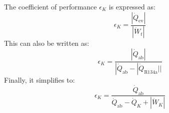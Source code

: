 The coefficient of performance \( \epsilon_K \) is expressed as:  
\[
\epsilon_K = \frac{|\dot{Q}_{\text{ev}}|}{|\dot{W}_t|}
\]  
This can also be written as:  
\[
\epsilon_K = \frac{|\dot{Q}_{\text{ab}}|}{|\dot{Q}_{\text{ab}} - |\dot{Q}_{\text{R134a}}||}
\]  
Finally, it simplifies to:  
\[
\epsilon_K = \frac{\dot{Q}_{\text{ab}}}{\dot{Q}_{\text{ab}} - \dot{Q}_K + |\dot{W}_K|}
\]